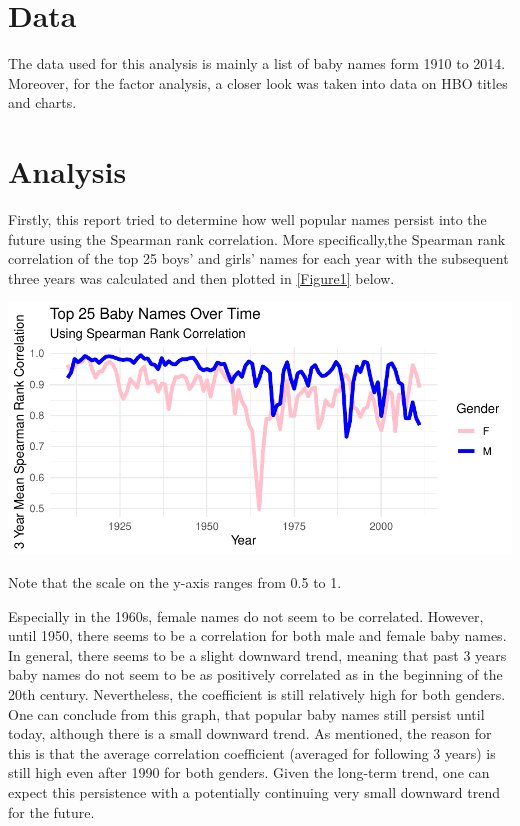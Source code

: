 \documentclass[11pt,preprint, authoryear]{elsarticle}
\let\origfigure\figure
\let\endorigfigure\endfigure
\renewenvironment{figure}[1][2] {
    \expandafter\origfigure\expandafter[H]
} {
    \endorigfigure
}
\numberwithin{equation}{section}
\numberwithin{figure}{section}
\numberwithin{table}{section}
\begin{document}
\hypertarget{data}{%
\section{Data}\label{data}}

The data used for this analysis is mainly a list of baby names form 1910
to 2014. Moreover, for the factor analysis, a closer look was taken into
data on HBO titles and charts.

\hypertarget{analysis}{%
\section{Analysis}\label{analysis}}

Firstly, this report tried to determine how well popular names persist
into the future using the Spearman rank correlation. More
specifically,the Spearman rank correlation of the top 25 boys' and
girls' names for each year with the subsequent three years was
calculated and then plotted in \ref{Figure1} below.

\begin{figure}[H]

{\centering \includegraphics{Question1_files/figure-latex/Figure1-1} 

}

\caption{Persistence of Baby Names over Time \label{Figure1}}\label{fig:Figure1}
\end{figure}

Note that the scale on the y-axis ranges from 0.5 to 1.

Especially in the 1960s, female names do not seem to be correlated.
However, until 1950, there seems to be a correlation for both male and
female baby names. In general, there seems to be a slight downward
trend, meaning that past 3 years baby names do not seem to be as
positively correlated as in the beginning of the 20th century.
Nevertheless, the coefficient is still relatively high for both genders.
One can conclude from this graph, that popular baby names still persist
until today, although there is a small downward trend. As mentioned, the
reason for this is that the average correlation coefficient (averaged
for following 3 years) is still high even after 1990 for both genders.
Given the long-term trend, one can expect this persistence with a
potentially continuing very small downward trend for the future.
\end{document}
